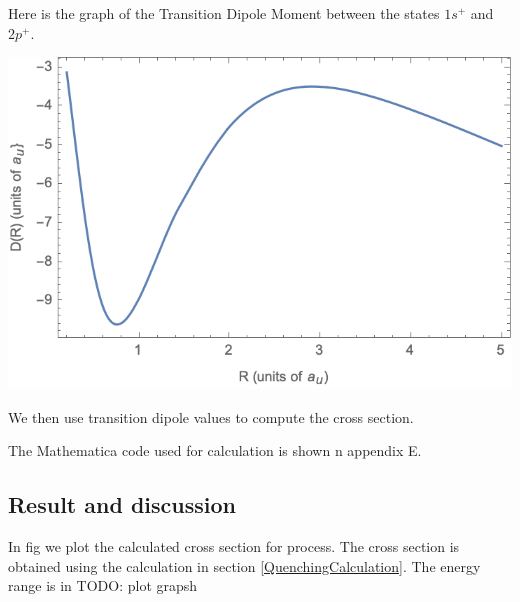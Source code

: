 Here is the graph of the Transition Dipole Moment between the states $ 1s^{+} $ and $ 2p^{+} $.

\includegraphics{DR.png}

We then use transition dipole values to compute the cross section. 


The Mathematica code used for calculation is shown n appendix E.

\subsection{Result and discussion}

In fig  we plot the calculated cross section for process. The cross section is obtained using the calculation in section \ref{QuenchingCalculation}. The energy range is in 
TODO: plot grapsh
